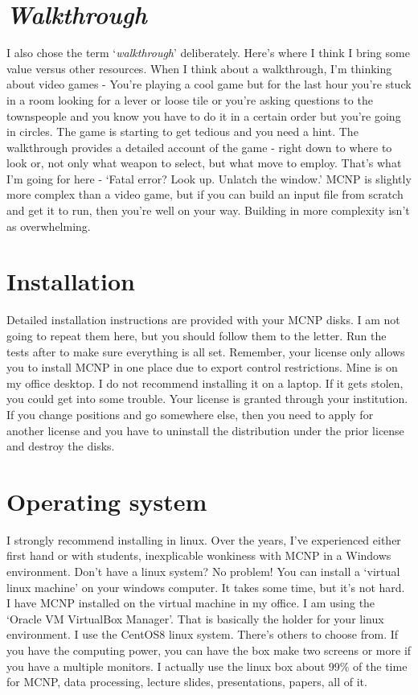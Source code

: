 \documentclass[11pt,a4paper]{article}
\begin{document}
\section{\textit{Walkthrough}}
\noindent I also chose the term `\textit{walkthrough}' deliberately. Here's where I think I bring some value versus other resources. When I think about a walkthrough, I'm thinking about video games - You're playing a cool game but for the last hour you're stuck in a room looking for a lever or loose tile or you're asking questions to the townspeople and you know you have to do it in a certain order but you're going in circles. The game is starting to get tedious and you need a hint. The walkthrough provides a detailed account of the game - right down to where to look or, not only what weapon to select, but what move to employ. That's what I'm going for here - `Fatal error? Look up. Unlatch the window.' MCNP is slightly more complex than a video game, but if you can build an input file from scratch and get it to run, then you're well on your way. Building in more complexity isn't as overwhelming. 

\newpage


\section{Installation}
\noindent Detailed installation instructions are provided with your MCNP disks. I am not going to repeat them here, but you should follow them to the letter. Run the tests after to make sure everything is all set. Remember, your license only allows you to install MCNP in one place due to export control restrictions. Mine is on my office desktop. I do not recommend installing it on a laptop. If it gets stolen, you could get into some trouble. Your license is granted through your institution. If you change positions and go somewhere else, then you need to apply for another license and you have to uninstall the distribution under the prior license and destroy the disks. 

\section{Operating system}
\noindent I strongly recommend installing in linux. Over the years, I've experienced either first hand or with students, inexplicable wonkiness with MCNP in a Windows environment. Don't have a linux system? No problem! You can install a `virtual linux machine' on your windows computer. It takes some time, but it's not hard. I have MCNP installed on the virtual machine in my office. I am using the `Oracle VM VirtualBox Manager'. That is basically the holder for your linux environment. I use the CentOS8 linux system. There's others to choose from. If you have the computing power, you can have the box make two screens or more if you have a multiple monitors. I actually use the linux box about 99\% of the time for MCNP, data processing, lecture slides, presentations, papers, all of it. 
\end{document}
